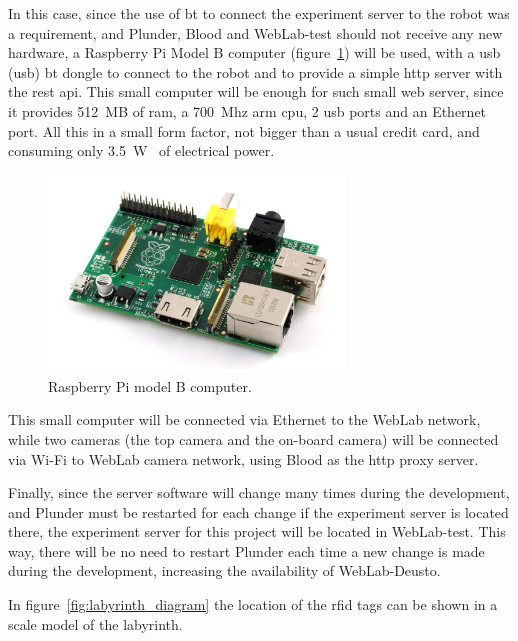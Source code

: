 In this case, since the use of \acrlong{bt} to connect the experiment server to the robot was a
requirement, and Plunder, Blood and WebLab-test should not receive any new hardware, a Raspberry Pi
Model B computer (figure~\ref{fig:rasp}) will be used, with a \acrshort{usb} (\acrlong{usb})
\acrlong{bt} dongle to connect to the robot and to provide a simple \acrshort{http} server with the
\acrshort{rest} \acrshort{api}. This small computer will be enough for such small web server, since
it provides 512~MB of \acrshort{ram}, a 700~Mhz \acrshort{arm} \acrshort{cpu}, 2 \acrshort{usb}
ports and an Ethernet port. All this in a small form factor, not bigger than a usual credit card,
and consuming only 3.5~W~\cite{rasp_b} of electrical power.

\begin{figure}[!htbp]
	\centering
	\includegraphics[width=0.7\textwidth]{fig/rasp.jpg}
	\caption{Raspberry Pi model B computer.}
	\label{fig:rasp}
\end{figure}

This small computer will be connected via Ethernet to the WebLab network, while two cameras (the top
camera and the on-board camera) will be connected via Wi-Fi to WebLab camera network, using Blood as
the \acrshort{http} proxy server.

Finally, since the server software will change many times during the development, and Plunder must
be restarted for each change if the experiment server is located there, the experiment server for
this project will be located in WebLab-test. This way, there will be no need to restart Plunder each
time a new change is made during the development, increasing the availability of WebLab-Deusto.

In figure~\ref{fig:labyrinth_diagram} the location of the \acrshort{rfid} tags can be shown in a
scale model of the labyrinth.

